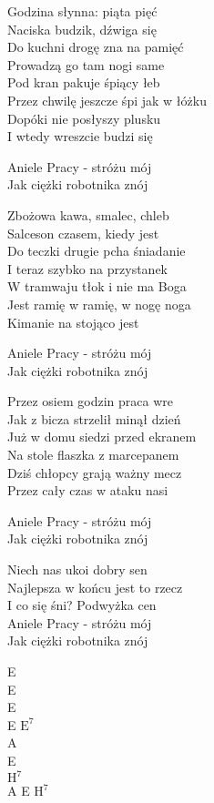 \begin{text}
    Godzina słynna: piąta pięć\\
    Naciska budzik, dźwiga się\\
    Do kuchni drogę zna na pamięć\\
    Prowadzą go tam nogi same\\
    Pod kran pakuje śpiący łeb\\
    Przez chwilę jeszcze śpi jak w łóżku\\
    Dopóki nie posłyszy plusku\\
    I wtedy wreszcie budzi się

    Aniele Pracy - stróżu mój\\
    Jak ciężki robotnika znój

    Zbożowa kawa, smalec, chleb\\
    Salceson czasem, kiedy jest\\
    Do teczki drugie pcha śniadanie\\
    I teraz szybko na przystanek\\
    W tramwaju tłok i nie ma Boga\\
    Jest ramię w ramię, w nogę noga\\
    Kimanie na stojąco jest

    Aniele Pracy - stróżu mój\\
    Jak ciężki robotnika znój

    Przez osiem godzin praca wre\\
    Jak z bicza strzelił minął dzień\\
    Już w domu siedzi przed ekranem\\
    Na stole flaszka z marcepanem\\
    Dziś chłopcy grają ważny mecz\\
    Przez cały czas w ataku nasi

    Aniele Pracy - stróżu mój\\
    Jak ciężki robotnika znój

    Niech nas ukoi dobry sen\\
    Najlepsza w końcu jest to rzecz\\
    I co się śni? Podwyżka cen\\
    Aniele Pracy - stróżu mój\\
    Jak ciężki robotnika znój
\end{text}
\begin{chord}
    E\\
    E\\
    E\\
    E $\mathrm{E^{7}}$\\
    A\\
    E\\
    $\mathrm{H^{7}}$\\
    A E $\mathrm{H^{7}}$
\end{chord}
